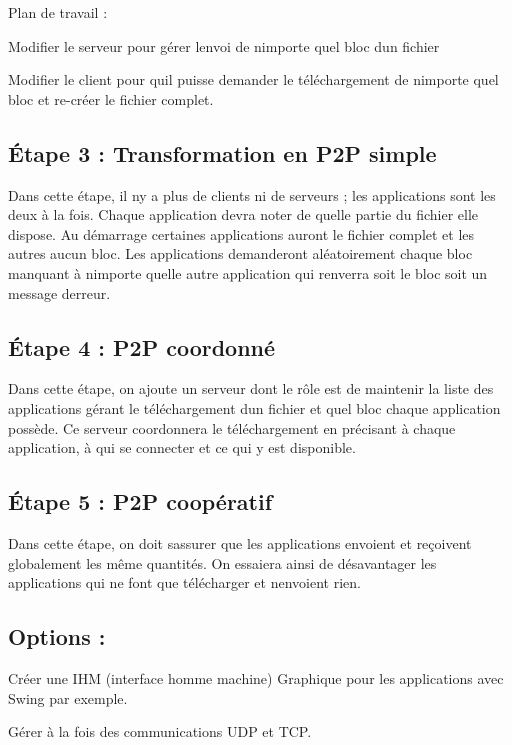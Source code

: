 Plan de travail \+:


\begin{DoxyItemize}
\item Modifier le serveur pour gérer l\textquotesingle{}envoi de n\textquotesingle{}importe quel bloc d\textquotesingle{}un fichier
\item Modifier le client pour qu\textquotesingle{}il puisse demander le téléchargement de n\textquotesingle{}importe quel bloc et re-\/créer le fichier complet.
\end{DoxyItemize}

\subsection*{Étape 3 \+: Transformation en P2P simple}

Dans cette étape, il n\textquotesingle{}y a plus de clients ni de serveurs ; les applications sont les deux à la fois. Chaque application devra noter de quelle partie du fichier elle dispose. Au démarrage certaines applications auront le fichier complet et les autres aucun bloc. Les applications demanderont aléatoirement chaque bloc manquant à n\textquotesingle{}importe quelle autre application qui renverra soit le bloc soit un message d\textquotesingle{}erreur.

\subsection*{Étape 4 \+: P2P coordonné}

Dans cette étape, on ajoute un serveur dont le rôle est de maintenir la liste des applications gérant le téléchargement d\textquotesingle{}un fichier et quel bloc chaque application possède. Ce serveur coordonnera le téléchargement en précisant à chaque application, à qui se connecter et ce qui y est disponible.

\subsection*{Étape 5 \+: P2P coopératif}

Dans cette étape, on doit s\textquotesingle{}assurer que les applications envoient et reçoivent globalement les même quantités. On essaiera ainsi de désavantager les applications qui ne font que télécharger et n\textquotesingle{}envoient rien.

\subsection*{Options \+:}


\begin{DoxyItemize}
\item Créer une I\+HM (interface homme machine) Graphique pour les applications avec Swing par exemple.
\item Gérer à la fois des communications U\+DP et T\+CP. 
\end{DoxyItemize}
